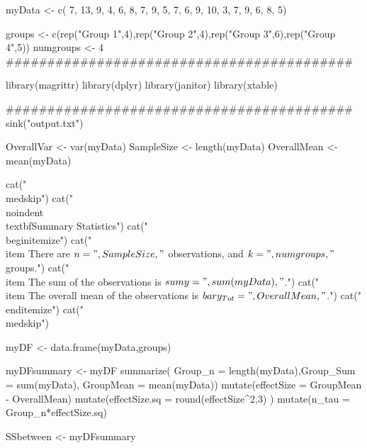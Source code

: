 myData <- c(
7, 13, 9, 4,
6, 8, 7, 9,
5, 7, 6, 9, 10, 3,
7, 9, 6, 8, 5)

groups <- c(rep("Group 1",4),rep("Group 2",4),rep("Group 3",6),rep("Group 4",5))
numgroups <- 4
##########################################

library(magrittr)
library(dplyr)
library(janitor) 
library(xtable)

##########################################
sink("output.txt")

OverallVar <- var(myData) %
SampleSize <- length(myData)
OverallMean <- mean(myData) %

cat("\n\\medskip")
cat("\n\n\\noindent \\textbf{Summary Statistics}") 
cat("\n\\begin{itemize}")
cat("\n\\item There are $n =",SampleSize ,"$ observations, and $k =",numgroups,"$ groups.")
cat("\n\\item The sum of the observations is $\\sum y =",sum(myData),"$.")
cat("\n\\item The overall mean of the observations is $\\bar{y}_{Tot} =",OverallMean ,"$.")
cat("\n\\end{itemize}")
cat("\n\\medskip")



myDF <- data.frame(myData,groups)

myDFsummary <- myDF %
  summarize( Group_n =  length(myData),Group_Sum =  sum(myData), GroupMean =  mean(myData)) %
  mutate(effectSize = GroupMean - OverallMean) %
  mutate(effectSize.sq  = round(effectSize^2,3) ) %
  mutate(n_tau = Group_n*effectSize.sq)  %

SSbetween <- myDFsummary  %


